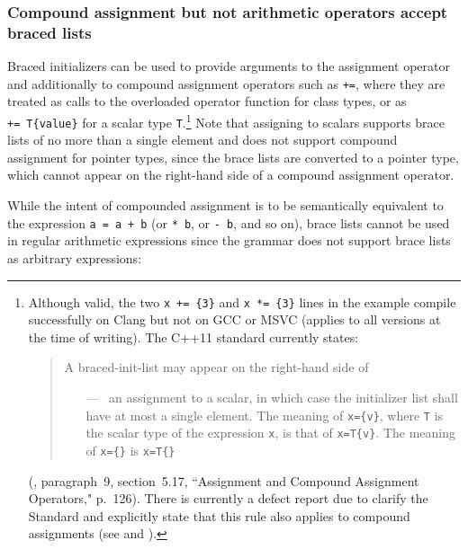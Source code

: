 \subsubsection[Compound assignment but not arithmetic operators accept braced lists]{Compound assignment but not arithmetic operators accept braced lists}\label{compound-assignment-but-not-arithmetic-operators-accept-braced-lists}

Braced initializers can be used to provide arguments to the assignment
operator and additionally to compound assignment operators such as
\lstinline!+=!, where they are treated as calls to the overloaded operator
function for class types, or as \lstinline!+=!~\lstinline!T{value}! for a
scalar type \lstinline!T!.{\cprotect\footnote{Although valid, the two
  \lstinline!x!~\lstinline!+=!~\lstinline!{3}! and
  \lstinline!x!~\lstinline!*=!~\lstinline!{3}! lines in the example compile
  successfully on Clang but not on GCC or MSVC (applies to all versions
  at the time of writing). The C++11 standard currently states:
  \begin{quote}
  A braced-init-list may appear on the right-hand side of
  \begin{itemize}
  \item[---~]{an assignment to a scalar, in which case the initializer list
  shall have at most a single element. The meaning of
  \lstinline!x={v}!, where \lstinline!T! is the scalar
  type of the expression \lstinline!x!, is that of
  \lstinline!x=T{v}!. The meaning of
  \lstinline!x={}! is
  \lstinline!x=T{}!}
  \end{itemize}
  \end{quote}
  (\cite{cpp11}, paragraph~9, section~5.17, ``Assignment and Compound Assignment Operators," p.~126). There is currently a defect
  report due to clarify the Standard and explicitly state that this rule
  also applies to compound assignments (see \cite{miller12} and
  \cite{miller21}).}} Note
that assigning to scalars supports brace lists of no more than a single
element and does not support compound assignment for pointer types,
since the brace lists are converted to a pointer type, which cannot
appear on the right-hand side of a compound assignment operator.

While the intent of compounded assignment is to be semantically
equivalent to the expression
\lstinline!a!~\lstinline!=!~\lstinline!a!~\lstinline!+!~\lstinline!b! (or
\lstinline!*!~\lstinline!b!, or \lstinline!-!~\lstinline!b!, and so on), brace lists
cannot be used in regular arithmetic expressions since the grammar does
not support brace lists as arbitrary expressions:

